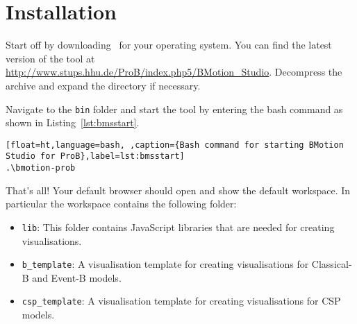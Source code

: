\section{Installation}
\label{tutorial_02}

Start off by downloading \bms~for your operating system. 
You can find the latest version of the tool at \url{http://www.stups.hhu.de/ProB/index.php5/BMotion_Studio}.
Decompress the archive and expand the directory if necessary. 


Navigate to the \texttt{bin} folder and start the tool by entering the bash command as shown in Listing~\ref{lst:bmsstart}.

\begin{lstlisting}[float=ht,language=bash, ,caption={Bash command for starting BMotion Studio for ProB},label=lst:bmsstart]
.\bmotion-prob
\end{lstlisting}


That's all! 
Your default browser should open and show the default workspace.
In particular the workspace contains the following folder:

\begin{itemize}
\item \texttt{lib}: This folder contains JavaScript libraries that are needed for creating visualisations.
\item \texttt{b\_template}: A visualisation template for creating visualisations for Classical-B and Event-B models.
\item \texttt{csp\_template}: A visualisation template for creating visualisations for CSP models.
\end{itemize}






